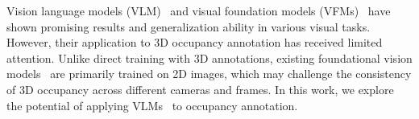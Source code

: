 \vspace{1mm}
Vision language models (VLM)~\cite{kuo2022f, xu2021vlm} and visual foundation models (VFMs)~\cite{ravi2024sam, scheirer2012toward} have shown promising results and generalization ability in various visual tasks.
However, their application to 3D occupancy annotation has received limited attention.
Unlike direct training with 3D annotations, existing foundational vision models~\cite{kirillov2023segment, ke2024segment, liu2023grounding, ren2024grounded} are primarily trained on 2D images, which may challenge the consistency of 3D occupancy across different cameras and frames.
%
In this work, we explore the potential of applying VLMs~\cite{kirillov2023segment, liu2023grounding, ren2024grounded} to occupancy annotation.